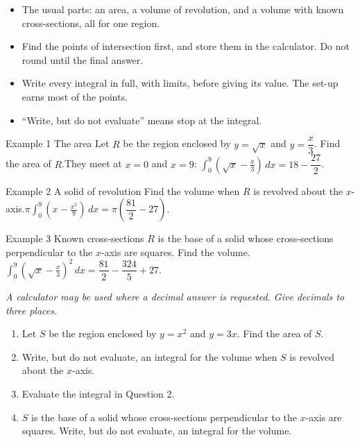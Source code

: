 \documentclass[11pt]{article}
\begin{document}

\begin{ideabox}
\begin{itemize}[leftmargin=*,itemsep=2pt,topsep=2pt]
  \item The usual parts: an area, a volume of revolution, and a volume with known cross-sections, all for one region.
  \item Find the points of intersection first, and store them in the calculator. Do not round until the final answer.
  \item Write every integral in full, with limits, before giving its value. The set-up earns most of the points.
  \item \textquotedblleft{}Write, but do not evaluate\textquotedblright{} means stop at the integral.
\end{itemize}
\end{ideabox}

\begin{example}{Example 1 \textperiodcentered{} The area}
Let $R$ be the region enclosed by $y=\sqrt{x}$ and $y=\dfrac x3$. Find the area of $R$.\soln They meet at $x=0$ and $x=9$: $\displaystyle\int_{0}^{9}\left(\sqrt x-\tfrac x3\right)\,dx=18-\dfrac{27}{2}$.
\end{example}

\begin{example}{Example 2 \textperiodcentered{} A solid of revolution}
Find the volume when $R$ is revolved about the $x$-axis.\soln $\pi\displaystyle\int_{0}^{9}\left(x-\tfrac{x^2}{9}\right)\,dx=\pi\left(\dfrac{81}{2}-27\right)$.
\end{example}

\begin{example}{Example 3 \textperiodcentered{} Known cross-sections}
$R$ is the base of a solid whose cross-sections perpendicular to the $x$-axis are squares. Find the volume.\soln $\displaystyle\int_{0}^{9}\left(\sqrt x-\tfrac x3\right)^2\,dx=\dfrac{81}{2}-\dfrac{324}{5}+27$.
\end{example}

\newpage
{}
\emph{A calculator may be used where a decimal answer is requested. Give decimals to three places.}
\begin{enumerate}[leftmargin=*,itemsep=2pt]
  \item Let $S$ be the region enclosed by $y=x^2$ and $y=3x$. Find the area of $S$.\work{2.3cm}
  \item Write, but do not evaluate, an integral for the volume when $S$ is revolved about the $x$-axis.\work{2.3cm}
  \item Evaluate the integral in Question 2.\work{2.3cm}
  \item $S$ is the base of a solid whose cross-sections perpendicular to the $x$-axis are squares. Write, but do not evaluate, an integral for the volume.\work{2.3cm}
\end{enumerate}
\end{document}
